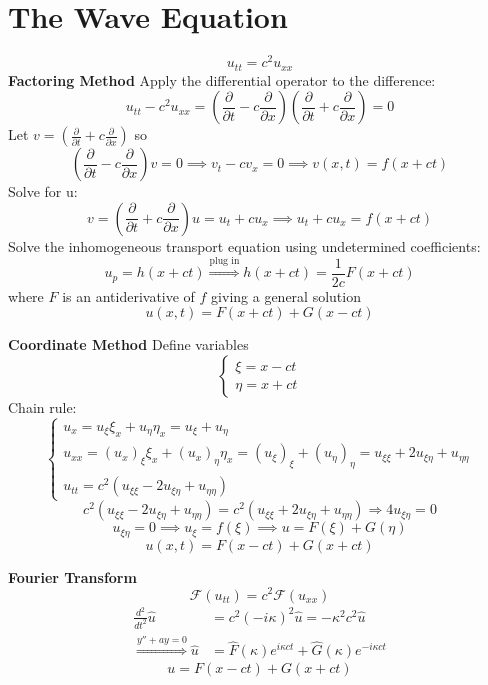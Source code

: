 \documentclass[12pt]{article}
\renewcommand{\hat}[1]{\widehat{#1}}
\newcommand{\F}[1]{\mathcal{F}(#1)}
\begin{document}
\section*{The Wave Equation}
\[u_{tt} = c^2 u_{xx}\]
\textbf{Factoring Method}
Apply the differential operator to the difference:
\[u_{tt} - c^2 u_{xx} = \left(\frac{\partial}{\partial t} - c \frac{\partial}{\partial x}\right)\left(\frac{\partial}{\partial t} + c\frac{\partial}{\partial x}\right) = 0\]
Let $v = (\frac{\partial}{\partial t} + c\frac{\partial}{\partial x})$ so 
\[\left(\frac{\partial}{\partial t} - c \frac{\partial}{\partial x}\right)v = 0 \implies v_t - cv_x = 0 \implies v(x, t) = f(x + ct)\]
Solve for u:
\[v = \left(\frac{\partial}{\partial t} + c\frac{\partial}{\partial x}\right)u = u_t + cu_x \implies u_t + cu_x = f(x + ct)\]
Solve the inhomogeneous transport equation using undetermined coefficients:
\[u_p = h(x + ct) \overset{\text{plug in}}{\Longrightarrow} h(x + ct) = \frac{1}{2c}F(x + ct)\]
where $F$ is an antiderivative of $f$ giving a general solution
\[u(x, t) = F(x + ct) + G(x - ct)\]

\textbf{Coordinate Method}
Define variables 
\[\begin{cases}
    \xi = x - ct\\
    \eta = x + ct
\end{cases}\]
Chain rule:
\[\begin{cases}
    u_x = u_\xi \xi_x + u_\eta \eta_x = u_\xi + u_\eta\\
    u_{xx} = (u_x)_\xi \xi_x + (u_x)_\eta \eta_x  = (u_\xi)_\xi + (u_\eta)_\eta = u_{\xi \xi} + 2u_{\xi \eta} + u_{\eta \eta}\\
    u_{tt} = c^2(u_{\xi \xi} - 2u_{\xi \eta} + u_{\eta \eta})  
\end{cases}\]
\[c^2(u_{\xi \xi} - 2u_{\xi \eta} + u_{\eta \eta}) = c^2(u_{\xi \xi} + 2u_{\xi \eta} + u_{\eta \eta}) \Longrightarrow 4u_{\xi \eta} = 0\]
\[u_{\xi \eta} = 0 \implies u_{\xi} = f(\xi) \implies u = F(\xi) + G(\eta)\]
\[u(x, t) = F(x - ct) + G(x + ct)\]

\textbf{Fourier Transform}
\[\F{u_{tt}} = c^2 \F{u_{xx}}\]
\begin{align*}
    \frac{d^2}{dt^2} \hat{u} &= c^2 (-i\kappa)^2 \hat{u}= -\kappa^2 c^2 \hat{u}\\
    \overset{y'' +ay=0}{\Longrightarrow} \hat{u} &= \hat{F}(\kappa)e^{i\kappa ct} + \hat{G}(\kappa)e^{-i\kappa ct}
\end{align*}
\[u = F(x - ct) + G(x + ct)\]
\end{document}

